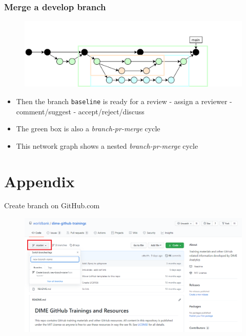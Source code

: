 \documentclass[aspectratio=169]{beamer} %
\begin{document}
\begin{frame}
	\frametitle{Merge a develop branch}
	
	\vspace{-.5cm}
	\begin{minipage}[t][5cm][t]{\textwidth}
		\begin{figure}
			\centering
			\includegraphics[width=\textwidth]{./img/dime-gitflow-network-2-6.png}
		\end{figure}
	\end{minipage}  
	
	\vspace{-.5cm}
	\begin{minipage}[t][5cm][t]{\textwidth}
		\begin{itemize}
			\setlength\itemsep{.5em}
			\item Then the branch \texttt{baseline} is ready for a review - assign a reviewer - comment/suggest - accept/reject/discuss
			\item The green box is also a \textit{branch-pr-merge} cycle
			\item This network graph shows a nested \textit{branch-pr-merge} cycle
		\end{itemize}
	\end{minipage}  
\end{frame}







\section{Appendix}

\begin{frame}{Create branch on GitHub.com}
\label{new-branch}

\begin{figure}
	\centering
	\includegraphics[width=.9\textwidth]{./img/new-branch-1.png}
\end{figure}
\end{frame}
\end{document}
